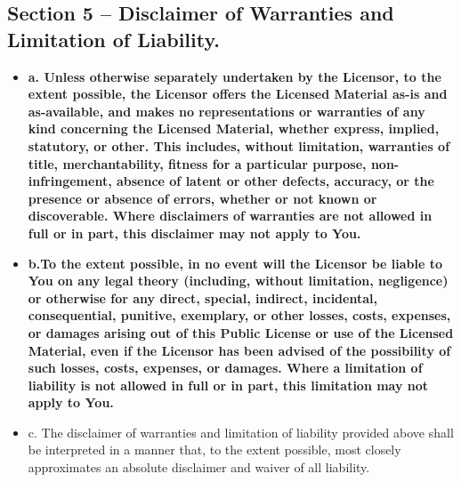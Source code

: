 \subsection*{Section 5 – Disclaimer of Warranties and Limitation of Liability.}
	\begin{itemize}
		\item \textbf{a. Unless otherwise separately undertaken by the Licensor, to the extent possible, the Licensor offers the Licensed Material as-is and as-available, and makes no representations or warranties of any kind concerning the Licensed Material, whether express, implied, statutory, or other. This includes, without limitation, warranties of title, merchantability, fitness for a particular purpose, non-infringement, absence of latent or other defects, accuracy, or the presence or absence of errors, whether or not known or discoverable. Where disclaimers of warranties are not allowed in full or in part, this disclaimer may not apply to You.}
		\item \textbf{ b.To the extent possible, in no event will the Licensor be liable to You on any legal theory (including, without limitation, negligence) or otherwise for any direct, special, indirect, incidental, consequential, punitive, exemplary, or other losses, costs, expenses, or damages arising out of this Public License or use of the Licensed Material, even if the Licensor has been advised of the possibility of such losses, costs, expenses, or damages. Where a limitation of liability is not allowed in full or in part, this limitation may not apply to You.}
		\item c. The disclaimer of warranties and limitation of liability provided above shall be interpreted in a manner that, to the extent possible, most closely approximates an absolute disclaimer and waiver of all liability.
	\end{itemize}

